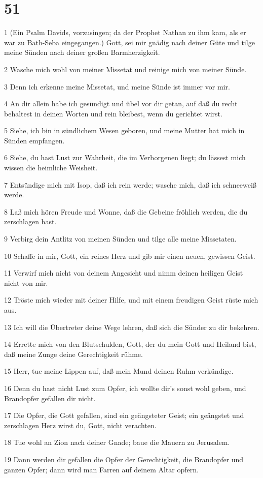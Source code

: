 \chapter{51}

\par 1 (Ein Psalm Davids, vorzusingen;  da der Prophet Nathan zu ihm kam, als er war zu Bath-Seba eingegangen.) Gott, sei mir gnädig nach deiner Güte und tilge meine Sünden nach deiner großen Barmherzigkeit.
\par 2 Wasche mich wohl von meiner Missetat und reinige mich von meiner Sünde.
\par 3 Denn ich erkenne meine Missetat, und meine Sünde ist immer vor mir.
\par 4 An dir allein habe ich gesündigt und übel vor dir getan, auf daß du recht behaltest in deinen Worten und rein bleibest, wenn du gerichtet wirst.
\par 5 Siehe, ich bin in sündlichem Wesen geboren, und meine Mutter hat mich in Sünden empfangen.
\par 6 Siehe, du hast Lust zur Wahrheit, die im Verborgenen liegt; du lässest mich wissen die heimliche Weisheit.
\par 7 Entsündige mich mit Isop, daß ich rein werde; wasche mich, daß ich schneeweiß werde.
\par 8 Laß mich hören Freude und Wonne, daß die Gebeine fröhlich werden, die du zerschlagen hast.
\par 9 Verbirg dein Antlitz von meinen Sünden und tilge alle meine Missetaten.
\par 10 Schaffe in mir, Gott, ein reines Herz und gib mir einen neuen, gewissen Geist.
\par 11 Verwirf mich nicht von deinem Angesicht und nimm deinen heiligen Geist nicht von mir.
\par 12 Tröste mich wieder mit deiner Hilfe, und mit einem freudigen Geist rüste mich aus.
\par 13 Ich will die Übertreter deine Wege lehren, daß sich die Sünder zu dir bekehren.
\par 14 Errette mich von den Blutschulden, Gott, der du mein Gott und Heiland bist, daß meine Zunge deine Gerechtigkeit rühme.
\par 15 Herr, tue meine Lippen auf, daß mein Mund deinen Ruhm verkündige.
\par 16 Denn du hast nicht Lust zum Opfer, ich wollte dir's sonst wohl geben, und Brandopfer gefallen dir nicht.
\par 17 Die Opfer, die Gott gefallen, sind ein geängsteter Geist; ein geängstet und zerschlagen Herz wirst du, Gott, nicht verachten.
\par 18 Tue wohl an Zion nach deiner Gnade; baue die Mauern zu Jerusalem.
\par 19 Dann werden dir gefallen die Opfer der Gerechtigkeit, die Brandopfer und ganzen Opfer; dann wird man Farren auf deinem Altar opfern.

